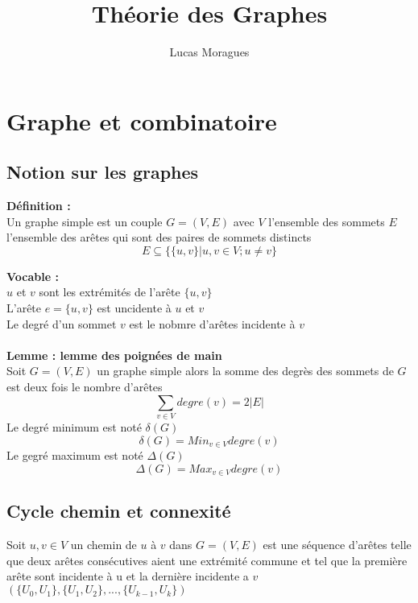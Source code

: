 \documentclass{report}
\title{Théorie des Graphes}
\author{Lucas Moragues}
\newcommand{\deffinition}{\textcolor[rgb]{0.65,0,0.7}{Définition : }}
\newcommand{\Def}{\textbf{\deffinition}}
\newcommand{\lemme}{\textcolor[rgb]{0,0.2,0.80}{Lemme : }}
\newcommand{\vocable}{\textcolor[rgb]{0,0,0.50}{Vocable : }}
\newcommand{\Vocable}{\textbf{\vocable}}
\begin{document}
\maketitle
\renewcommand{\contentsname}{Sommaire}
\setcounter{tocdepth}{3}
\tableofcontents
\chapter{Graphe et combinatoire}
\setcounter{section}{-1}
\section{Notion sur les graphes}											%
\Def\\
Un graphe simple est un couple $G=(V,E)$ avec $V$ l'ensemble des sommets $E$ l'ensemble des arêtes qui sont des paires de sommets distincts\\
$$E \subseteq \{\{u,v\}|u,v \in V ; u \neq v\}$$

\Vocable\\
$u$ et $v$ sont les extrémités de l'arête $\{u,v\}$\\
L'arête $e =\{u,v\}$ est uncidente à $u$ et $v$\\
Le degré d'un sommet $v$ est le nobmre d'arêtes incidente à $v$\\\\

\textbf{\lemme lemme des poignées de main}\\
Soit $G=(V,E)$ un graphe simple alors la somme des degrès des sommets de $G$ est deux fois le nombre d'arêtes\\ 
$$\sum_{v\in V}degre(v)=2|E|$$
Le degré minimum est noté $\delta(G)$\\
$$\delta(G)=Min_{v\in V} degre(v)$$
Le gegré maximum est noté $\Delta(G)$\\
$$\Delta(G)=Max_{v\in V} degre(v)$$

\section{Cycle chemin et connexité}

Soit $u,v \in V$ un chemin de $u$ à $v$ dans $G=(V,E)$ est une séquence d'arêtes telle que deux arêtes consécutives aient une extrémité commune et tel que la première arête sont incidente à u et la dernière incidente a $v$ $(\{U_0,U_1\},\{U_1,U_2\},...,\{U_{k-1},U_k\})$\\
\end{document}
